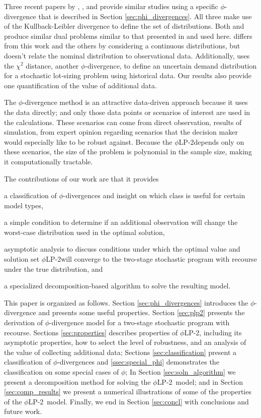 \documentclass[ijoc,letterpaper]{informs3} %
\newcommand{\plp}{$\phi$LP-2}
\begin{document}
Three recent papers by \cite{wang2010likelihood}, \cite{calafiore2007ambiguous}, and \cite{hukullback} provide similar studies using a specific $\phi$-divergence that is described in Section \ref{sec:phi_divergences}.
All three make use of the Kullback-Leibler divergence to define the set of distributions.
Both \cite{wang2010likelihood} and \cite{hukullback} produce similar dual problems similar to that presented in \cite{bental2011robust} and used here.
\cite{hukullback} differs from this work and the others by considering a continuous distributions, but doesn't relate the nominal distribution to observational data.
Additionally, \cite{klabjan2013robust} uses the $\chi^2$ distance, another $\phi$-divergence, to define an uncertain demand distribution for a stochastic lot-sizing problem using historical data.
Our results also provide one quantification of the value of additional data.

The $\phi$-divergence method is an attractive data-driven approach because it uses the data directly; and only those data points or scenarios of interest are used in the calculations.
These scenarios can come from direct observation, results of simulation, from expert opinion regarding scenarios that the decision maker would especially like to be robust against.
Because the \plp depends only on these scenarios, the size of the problem is polynomial in the sample size, making it computationally tractable.

The contributions of our work are that it provides
\begin{inparaenum}
	\item a classification of $\phi$-divergences and insight on which class is useful for certain model types,
	\item a simple condition to determine if an additional observation will change the worst-case distribution used in the optimal solution,
	\item asymptotic analysis to discuss conditions under which the optimal value and solution set \plp will converge to the two-stage stochastic program with recourse under the true distribution, and
	\item a specialized decomposition-based algorithm to solve the resulting model.
\end{inparaenum}

This paper is organized as follows.
Section \ref{sec:phi_divergences} introduces the $\phi$-divergence and presents some useful properties.
Section \ref{sec:plp2} presents the derivation of $\phi$-divergence model for a two-stage stochastic program with recourse.
Sections \ref{sec:properties} describes properties of \plp, including its asymptotic properties, how to select the level of robustness, and an analysis of the value of collecting additional data;
Sections \ref{sec:classification} present a classification of $\phi$-divergences and \ref{ssec:special_phi} demonstrates the classification on some special cases of $\phi$; 
In Section \ref{sec:soln_algorithm} we present a decomposition method for solving the \plp\ model; and in Section \ref{sec:comp_results} we present a numerical illustrations of some of the properties of the \plp\ model.
Finally, we end in Section \ref{sec:concl} with conclusions and future work.
\end{document}
